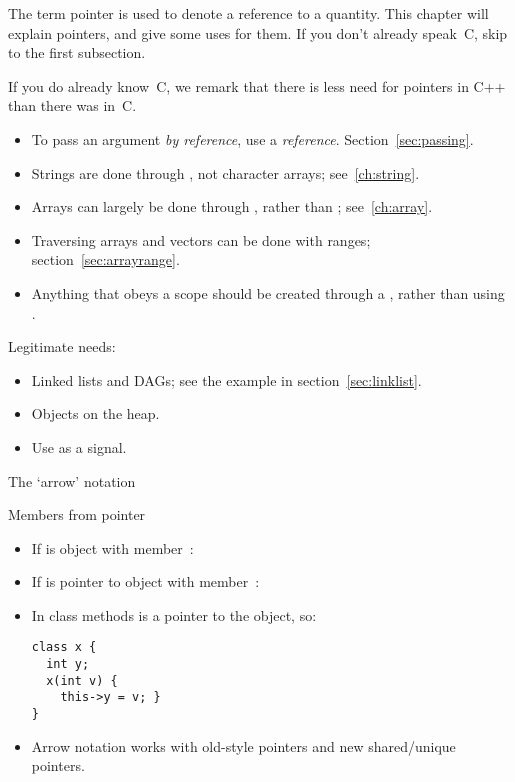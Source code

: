 
The term pointer is used to denote a reference to a quantity.  This
chapter will explain pointers, and give some uses for them.  If you
don't already speak~C, skip to the first subsection.

If you do
already know~C, we remark that there is less need for pointers in C++
than there was in~C.

\begin{itemize}
\item To pass an argument
  \emph{by reference},
  use a \emph{reference}.
  Section~\ref{sec:passing}.
\item Strings are done through , not character arrays;
  see~\ref{ch:string}.
\item Arrays can largely be done through , rather than
  ; see~\ref{ch:array}.
\item Traversing arrays and vectors can be done with ranges;
  section~\ref{sec:arrayrange}.
\item Anything that obeys a scope should be created through a
  , rather than using .
\end{itemize}

Legitimate needs:
\begin{itemize}
\item Linked lists and \acp{DAG}; see the example in section~\ref{sec:linklist}.
\item Objects on the heap.
\item Use  as a signal.
\end{itemize}

 {The `arrow' notation}

\begin{block}{Members from pointer}
  \begin{itemize}
  \item If  is object with member~:\\ 
  \item If  is pointer to object with member~:\\ 
  \item In class methods  is a pointer to the object, so:
\begin{lstlisting}
class x {
  int y;
  x(int v) {
    this->y = v; }
}
\end{lstlisting}
\item Arrow notation works with old-style pointers and new
  shared/unique pointers.
  \end{itemize}
\end{block}

